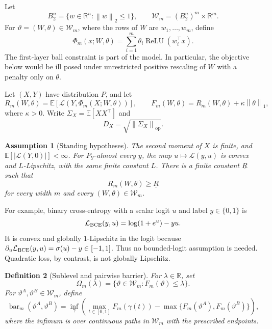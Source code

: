 \documentclass[pdflatex,sn-mathphys-num]{sn-jnl}
\theoremstyle{thmstyleone}
\theoremstyle{thmstyletwo}
\theoremstyle{thmstylethree}
\newtheorem{definition}{Definition}[section]
\newtheorem{assumption}[definition]{Assumption}
\newcommand{\relu}{\operatorname{ReLU}}
\newcommand{\E}{\mathbb{E}}
\newcommand{\R}{\mathbb{R}}
\newcommand{\norm}[1]{\left\lVert #1 \right\rVert}
\newcommand{\abs}[1]{\left\lvert #1 \right\rvert}
\newcommand{\SigX}{\Sigma_X}
\begin{document}
Let
\[
B_2^n=\{w\in\R^n:\norm{w}_2\le 1\},
\qquad
\mathcal W_m=(B_2^n)^m\times\R^m.
\]
For $\vartheta=(W,\theta)\in\mathcal W_m$, where the rows of $W$ are $w_1,\ldots,w_m$, define
\begin{equation}
\Phi_m(x;W,\theta)
=\sum_{i=1}^m\theta_i\relu(w_i^\top x).
\label{eq:model}
\end{equation}
The first-layer ball constraint is part of the model. In particular, the objective below would be ill posed under unrestricted positive rescaling of $W$ with a penalty only on $\theta$.

Let $(X,Y)$ have distribution $P$, and let
\begin{equation}
R_m(W,\theta)
=\E\!\left[\mathcal L\!\left(Y,\Phi_m(X;W,\theta)\right)\right],
\qquad
F_m(W,\theta)=R_m(W,\theta)+\kappa\norm{\theta}_1,
\label{eq:objective}
\end{equation}
where $\kappa>0$. Write $\SigX=\E[XX^\top]$ and
\[
D_X=\sqrt{\norm{\SigX}_{\mathrm{op}}}.
\]

\begin{assumption}[Standing hypotheses]\label{ass:standing}
The second moment of $X$ is finite, and $\E[\abs{\mathcal L(Y,0)}]<\infty$. For $P_Y$-almost every $y$, the map $u\mapsto\mathcal L(y,u)$ is convex and $L$-Lipschitz, with the same finite constant $L$. There is a finite constant $\underline R$ such that
\[
R_m(W,\theta)\ge \underline R
\]
for every width $m$ and every $(W,\theta)\in\mathcal W_m$.
\end{assumption}

For example, binary cross-entropy with a scalar logit $u$ and label $y\in\{0,1\}$ is
\begin{equation}
\mathcal L_{\rm BCE}(y,u)=\log(1+e^u)-yu.
\label{eq:bce-logit}
\end{equation}
It is convex and globally $1$-Lipschitz in the logit because
$\partial_u\mathcal L_{\rm BCE}(y,u)=\sigma(u)-y\in[-1,1]$.
Thus no bounded-logit assumption is needed. Quadratic loss, by contrast, is not globally Lipschitz.

\begin{definition}[Sublevel and pairwise barrier]
For $\lambda\in\R$, set
\[
\Omega_m(\lambda)=\{\vartheta\in\mathcal W_m:F_m(\vartheta)\le\lambda\}.
\]
For $\vartheta^A,\vartheta^B\in\mathcal W_m$, define
\begin{equation}
\operatorname{bar}_m(\vartheta^A,\vartheta^B)
=\inf_{\gamma}\left(
\max_{t\in[0,1]}F_m(\gamma(t))
-\max\{F_m(\vartheta^A),F_m(\vartheta^B)\}
\right),
\label{eq:pair-barrier}
\end{equation}
where the infimum is over continuous paths in $\mathcal W_m$ with the prescribed endpoints.
\end{definition}
\end{document}

